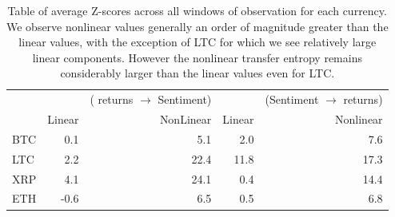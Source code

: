 \documentclass[]{rsos}%
\begin{document}
  \begin{table}[!htb]
    \label{t.table4}
    \caption{Table of average Z-scores across all windows of observation for each currency. We observe nonlinear values generally an order of magnitude greater than the linear values, with the exception of LTC for which we see relatively large linear components. However the nonlinear transfer entropy remains considerably larger than the linear values even for LTC.}
    
    \begin{tabular}{lrrrr}
      {} & {} & ({\color{blue} returns} $\rightarrow$ Sentiment) & {} & (Sentiment $\rightarrow$ {\color{blue} returns})  \\
      {} & Linear  &  NonLinear  &  Linear  &  Nonlinear  \\
      \hline 
      BTC &     0.1 &       5.1 &       2.0 &        7.6 \\
      LTC &     2.2 &      22.4 &      11.8 &       17.3 \\
      XRP &     4.1 &      24.1 &       0.4 &       14.4 \\
      ETH &    -0.6 &       6.5 &       0.5 &        6.8 \\
      \end{tabular}
    
  \end{table}


  \pagebreak


  \vskip10pc


  


\vskip2pc


\end{document}
